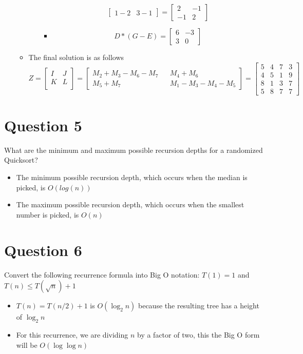 \documentclass{article}
\begin{document}
\begin{itemize}
\begin{itemize}
\begin{itemize}
\begin{itemize}
\[\begin{bmatrix}
						1 - 2 & 3 - 1
						\end{bmatrix}
						= 
						\begin{bmatrix}
						2 & -1 \\
						-1 & 2
						\end{bmatrix}
						\]
						\item
						\[
						D * (G - E) = 
						\begin{bmatrix}
						6 & -3 \\
						3 & 0
						\end{bmatrix}
						\]
					\end{itemize}
			\end{itemize}
		\item The final solution is as follows
			\[
			Z = 
			\begin{bmatrix}
			I & J \\
			K & L \\
			\end{bmatrix}
			=
			\begin{bmatrix}
			M_2 + M_3 - M_6 - M_7 && M_4 + M_6 \\
			M_5 + M_7 && M_1 - M_3 - M_4 - M_5
			\end{bmatrix}
			=
			\begin{bmatrix}
			5 & 4 & 7 & 3 \\
			4 & 5 & 1 & 9 \\
			8 & 1 & 3 & 7 \\
			5 & 8 & 7 & 7
			\end{bmatrix}
			\]
 		\end{itemize}
	\end{itemize}

	\pagebreak
	\section{Question 5}
	What are the minimum and maximum possible recursion depths for a randomized Quicksort?
		\begin{itemize}
			\item The minimum possible recursion depth, which occurs when the median is picked, is $O(log(n))$
			\item The maximum possible recursion depth, which occurs when the smallest number is picked, is $O(n)$
		\end{itemize}
	\section{Question 6}
	Convert the following recurrence formula into Big O notation: 
	$T(1) = 1$ and $T(n) \le T(\sqrt n)+1$ 
		\begin{itemize}
			\item $T(n) = T(n/2) + 1$ is $O(\log_2 n)$ because the resulting tree has a height of $\log_2 n$
			\item For this recurrence, we are dividing $n$ by a factor of two, this the Big O form will be $O(\log \log n)$
		\end{itemize}
\end{document}
